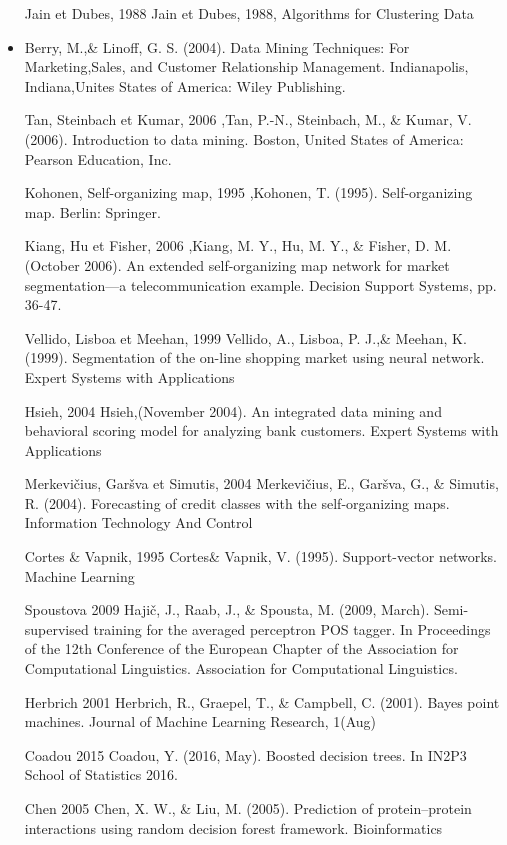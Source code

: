 \documentclass[12pt]{article}
\begin{document}
{\begin{itemize}
    \item [Jain et Dubes, 1988] Jain et Dubes, 1988, Algorithms for Clustering Data
    \item Berry, M.,\& Linoff, G. S. (2004). Data Mining Techniques: For Marketing,Sales, and Customer Relationship Management. Indianapolis, Indiana,Unites States of America: Wiley Publishing.
   \item [Tan, Steinbach et Kumar, 2006],Tan, P.-N., Steinbach, M., \& Kumar, V. (2006). Introduction to data mining. Boston, United States of America: Pearson Education, Inc.
   \item [Kohonen, Self-organizing map, 1995],Kohonen, T. (1995). Self-organizing map. Berlin: Springer.
   \item [Kiang, Hu et Fisher, 2006],Kiang, M. Y., Hu, M. Y., \& Fisher, D. M. (October 2006). An extended self-organizing map network for market segmentation—a telecommunication example. Decision Support Systems, pp. 36-47.
   \item [ Vellido, Lisboa et Meehan, 1999] Vellido, A., Lisboa, P. J.,\& Meehan, K. (1999). Segmentation of the on-line
shopping market using neural network. Expert Systems with Applications
   \item [Hsieh, 2004] Hsieh,(November 2004). An integrated data mining and behavioral scoring model for analyzing bank customers. Expert Systems with
Applications 
    \item [Merkevičius, Garšva et Simutis, 2004] Merkevičius, E., Garšva, G., \& Simutis, R. (2004). Forecasting of credit classes with the self-organizing maps. Information Technology And Control
     \item [Cortes \& Vapnik, 1995] Cortes\& Vapnik, V. (1995). Support-vector networks. Machine Learning
     \item [Spoustova 2009] Hajič, J., Raab, J., \& Spousta, M. (2009, March). Semi-supervised training for the averaged perceptron POS tagger. In Proceedings of the 12th Conference of the European Chapter of the Association for Computational Linguistics. Association for Computational Linguistics.
     \item [Herbrich 2001]Herbrich, R., Graepel, T., \& Campbell, C. (2001). Bayes point machines. Journal of Machine Learning Research, 1(Aug)
     \item [Coadou 2015] Coadou, Y. (2016, May). Boosted decision trees. In IN2P3 School of Statistics 2016.
     \item [Chen 2005]Chen, X. W., \& Liu, M. (2005). Prediction of protein–protein interactions using random decision forest framework. Bioinformatics

\end{itemize}}
\end{document}

